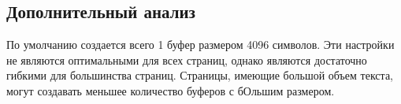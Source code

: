 \subsection{Дополнительный анализ}

По умолчанию создается всего 1 буфер размером 4096 символов.
Эти настройки не являются оптимальными для всех страниц, однако являются достаточно гибкими для большинства страниц.
Страницы, имеющие большой объем текста, могут создавать меньшее количество буферов с бОльшим размером.

